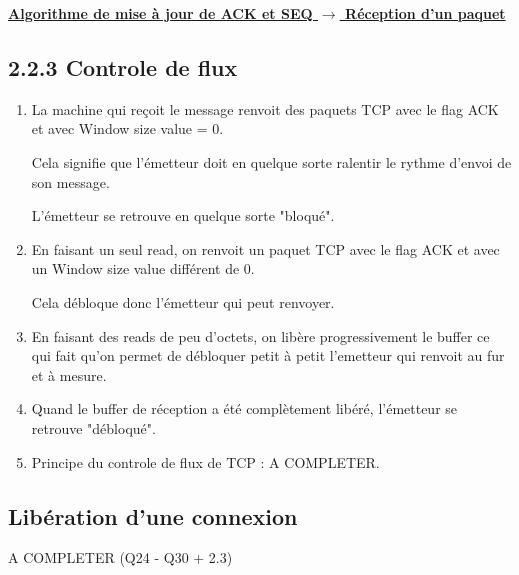 \documentclass{article}
\begin{document}
\begin{enumerate}[resume]
\begin{algorithm}
\end{algorithm}


\underline{\textbf{Algorithme de mise à jour de ACK et SEQ $\rightarrow$ Réception d'un paquet}}\\

\begin{algorithm}
\end{algorithm}

\end{enumerate}

\subsection*{2.2.3 Controle de flux}

\begin{enumerate}[resume]

	\item La machine qui reçoit le message renvoit des paquets TCP avec le flag ACK et avec Window size value = 0.

Cela signifie que l'émetteur doit en quelque sorte ralentir le rythme d'envoi de son message.

L'émetteur se retrouve en quelque sorte "bloqué".

	\item En faisant un seul read, on renvoit un paquet TCP avec le flag ACK et avec un Window size value différent de 0.

Cela débloque donc l'émetteur qui peut renvoyer.

	\item En faisant des reads de peu d'octets, on libère progressivement le buffer ce qui fait qu'on permet de débloquer petit à petit l'emetteur qui renvoit au fur et à mesure.

	\item Quand le buffer de réception a été complètement libéré, l'émetteur se retrouve "débloqué".

	\item Principe du controle de flux de TCP : A COMPLETER.
\end{enumerate}

\subsection*{Libération d'une connexion}

A COMPLETER (Q24 - Q30 + 2.3)
\end{document}
